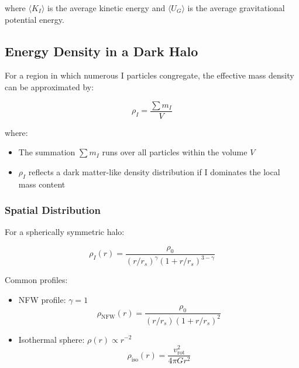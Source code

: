 where $\langle K_I \rangle$ is the average kinetic energy and $\langle U_G \rangle$ is the average gravitational potential energy.

\subsection{Energy Density in a Dark Halo}
\label{subsec:energy_density}

For a region in which numerous I particles congregate, the effective mass density can be approximated by:

\begin{equation}
\label{eq:i_density}
\rho_I = \frac{\sum m_I}{V}
\end{equation}

where:
\begin{itemize}
    \item The summation $\sum m_I$ runs over all particles within the volume $V$
    \item $\rho_I$ reflects a dark matter-like density distribution if I dominates the local mass content
\end{itemize}

\subsubsection{Spatial Distribution}

For a spherically symmetric halo:

\begin{equation}
\label{eq:halo_profile}
\rho_I(r) = \frac{\rho_0}{\left(r/r_s\right)^\gamma\left(1 + r/r_s\right)^{3-\gamma}}
\end{equation}

Common profiles:
\begin{itemize}
    \item NFW profile: $\gamma = 1$
    \begin{equation}
    \label{eq:nfw_profile}
    \rho_{\text{NFW}}(r) = \frac{\rho_0}{(r/r_s)(1 + r/r_s)^2}
    \end{equation}
    
    \item Isothermal sphere: $\rho(r) \propto r^{-2}$
    \begin{equation}
    \label{eq:isothermal_profile}
    \rho_{\text{iso}}(r) = \frac{v_{\text{rot}}^2}{4\pi G r^2}
    \end{equation}
\end{itemize}

